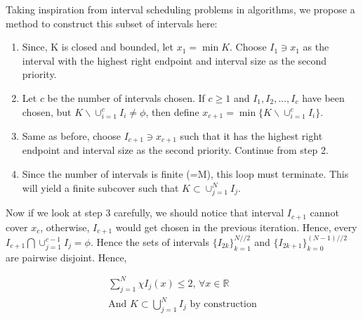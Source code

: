 \documentclass{article}
\newcommand{\R}{\mathbb{R}}
\begin{document}
Taking inspiration from interval scheduling problems in algorithms, we propose a method to construct this subset of intervals here:
\begin{enumerate}
    \item Since, K is closed and bounded, let $x_1 = \min K$. Choose $I_1 \ni x_1$ as the interval with the highest right endpoint and interval size as the second priority.
    
    \item Let $c$ be the number of intervals chosen. If $c \geq 1$ and $I_1, I_2, \dots, I_c$ have been chosen, but $K \backslash \cup_{i=1}^c I_i \neq \phi$, then define $x_{c+1} = \min \{K \backslash \cup_{i=1}^c I_i\}$.
    
    \item Same as before, choose $I_{c+1} \ni x_{c+1}$ such that it has the highest right endpoint and interval size as the second priority. Continue from step 2.

    \item Since the number of intervals is finite (=M), this loop must terminate. This will yield a finite subcover such that $K \subset \cup_{j=1}^N I_j$.
\end{enumerate}
Now if we look at step 3 carefully, we should notice that interval $I_{c+1}$ cannot cover $x_{c}$, otherwise, $I_{c+1}$ would get chosen in the previous iteration. Hence, every $I_{c+1} \bigcap \cup_{j=1}^{c-1}I_j = \phi$. Hence the sets of intervals $\{I_{2k}\}_{k=1}^{N//2}$ and $\{I_{2k+1}\}_{k=0}^{(N-1)//2}$ are pairwise disjoint. Hence,

\begin{gather*}
    \sum_{j=1}^{N}\chi I_j(x) \leq 2, \, \forall x\in \R\\
    \text{And } K \subset \bigcup_{j=1}^N I_j \text{ by construction}
\end{gather*}
\end{document}
